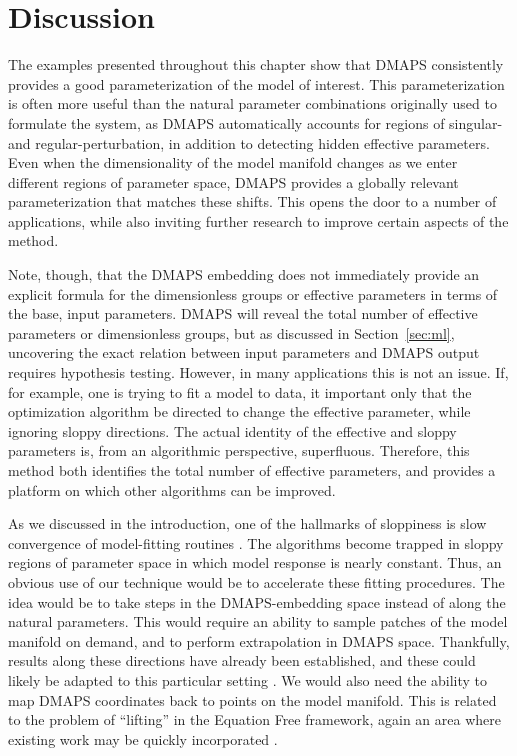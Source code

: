 \section{Discussion}

The examples presented throughout this chapter show that DMAPS
consistently provides a good parameterization of the model of
interest. This parameterization is often more useful than the natural
parameter combinations originally used to formulate the system, as
DMAPS automatically accounts for regions of singular- and
regular-perturbation, in addition to detecting hidden effective
parameters. Even when the dimensionality of the model manifold changes
as we enter different regions of parameter space, DMAPS provides a
globally relevant parameterization that matches these shifts. This
opens the door to a number of applications, while also inviting
further research to improve certain aspects of the method.


Note, though, that the DMAPS embedding does not immediately provide an
explicit formula for the dimensionless groups or effective parameters
in terms of the base, input parameters. DMAPS will reveal the total
number of effective parameters or dimensionless groups, but as
discussed in Section~\ref{sec:ml}, uncovering the exact relation
between input parameters and DMAPS output requires hypothesis
testing. However, in many applications this is not an issue. If, for
example, one is trying to fit a model to data, it important only that
the optimization algorithm be directed to change the effective
parameter, while ignoring sloppy directions. The actual identity of
the effective and sloppy parameters is, from an algorithmic
perspective, superfluous. Therefore, this method both identifies the
total number of effective parameters, and provides a platform on which
other algorithms can be improved.


As we discussed in the introduction, one of the hallmarks of
sloppiness is slow convergence of model-fitting routines
\cite{transtrum_geometry_2011}. The algorithms become trapped in
sloppy regions of parameter space in which model response is nearly
constant. Thus, an obvious use of our technique would be to accelerate
these fitting procedures. The idea would be to take steps in the
DMAPS-embedding space instead of along the natural parameters. This
would require an ability to sample patches of the model manifold on
demand, and to perform extrapolation in DMAPS space. Thankfully,
results along these directions have already been established, and
these could likely be adapted to this particular setting
\cite{chiavazzo_intrinsic_2017}. We would also need the ability to map
DMAPS coordinates back to points on the model manifold. This is
related to the problem of ``lifting'' in the Equation Free framework,
again an area where existing work may be quickly incorporated
\cite{rajendran_data_2016,laing_equation-free_2015,laing_coarse-grained_2007}.

